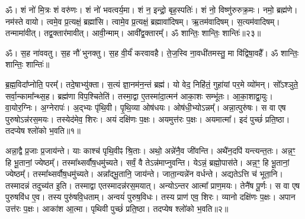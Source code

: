ॐ। शं नो॑ मि॒त्रः शं वरु॑णः। 
शं नो॑ भवत्वर्य॒मा। 
शं न॒ इन्द्रो॒ बृह॒स्पतिः॑। 
शं नो॒ विष्णु॑रुरुक्र॒मः। 
नमो॒ ब्रह्म॑णे। 
नम॑स्ते वायो। 
त्वमे॒व प्र॒त्यक्षं॒ ब्रह्मा॑सि। 
त्वामे॒व प्र॒त्यक्षं॒ ब्रह्मावा॑दिषम्। 
ऋ॒तम॑वादिषम्। 
स॒त्यम॑वादिषम्। 
तन्मामा॑वीत्। 
तद्व॒क्तार॑मावीत्। 
आवी॒न्माम्। 
आवी᳚द्व॒क्तारम्᳚। 
ॐ शान्तिः॒ शान्तिः॒ शान्तिः॑॥२३॥
\anuvakamend[स॒त्यम॑वादिषं॒ पञ्च॑ च]

\clearpage

\setcounter{anuvakam}{0}
ॐ। स॒ह ना॑ववतु। 
स॒ह नौ॑ भुनक्तु। 
स॒ह वी॒र्यं॑ करवावहै। 
ते॒ज॒स्वि ना॒वधी॑तमस्तु॒ मा वि॑द्विषा॒वहै᳚। 
ॐ शान्तिः॒ शान्तिः॒ शान्तिः॑॥%


ब्र॒ह्म॒विदा᳚प्नोति॒ परम्᳚। 
तदे॒षाभ्यु॑क्ता। 
स॒त्यं ज्ञा॒नम॑\-न॒न्तं ब्रह्म॑। 
यो वेद॒ निहि॑तं॒ गुहा॑यां पर॒मे व्यो॑मन्। 
सो᳚ऽश्ञुते॒ सर्वा॒न्कामा᳚न्थ्स॒ह। 
ब्रह्म॑णा वि\-प॒श्चितेति॑। 
तस्मा॒द्वा ए॒तस्मा॑\-दा॒त्मन॑ आका॒शः सम्भू॑तः। 
आ॒का॒शाद्वा॒युः। 
वा॒योर॒ग्निः। 
अ॒ग्नेरापः॑। 
अ॒द्भ्यः पृ॑थि॒वी। 
पृ॒थि॒व्या ओष॑धयः। 
ओष॑धी॒भ्यो\-ऽ\-न्नम्᳚। 
अन्ना॒त्पुरु॑षः। 
स वा एष पुरुषो\-ऽन्न॑\-रस॒मयः। 
तस्येद॑\-मेव॒ शिरः। 
अयं दक्षि॑णः प॒क्षः। 
अयमुत्त॑रः प॒क्षः। 
अयमात्मा᳚। 
इदं पुच्छं॑ प्रति\-॒ष्ठा। 
तदप्येष श्लो॑को भ॒वति॥१॥

अन्ना॒द्वै प्र॒जाः प्र॒जाय॑न्ते। 
याः काश्च॑ पृथि॒वीꣴ श्रि॒ताः। 
अथो॒ अन्ने॑नै॒व जी॑वन्ति। 
अथै॑न॒दपि॑ यन्त्यन्त॒तः। 
अन्न॒ꣳ॒ हि भू॒तानां॒ ज्येष्ठम्᳚। 
तस्मा᳚थ्सर्वौष॒धमु॑च्यते। 
सर्वं॒ वै तेऽन्न॑माप्नुवन्ति। 
येऽन्नं॒ ब्रह्मो॒पास॑ते। 
अन्न॒ꣳ॒ हि भू॒तानां॒ ज्येष्ठम्᳚। 
तस्मा᳚थ्सर्वौष॒धमु॑च्यते। 
अन्ना᳚द्भू॒तानि॒ जाय॑न्ते। 
जाता॒न्यन्ने॑न वर्धन्ते। 
अद्यतेऽत्ति च॑ भूता॒नि। 
तस्मादन्नं तदुच्य॑त इ॒ति। 
तस्माद्वा एतस्मादन्न॑रस॒मयात्। 
अन्योऽन्तर आत्मा᳚ प्राण॒मयः। 
तेनै॑ष पू॒र्णः। 
स वा एष पुरुषवि॑ध ए॒व। 
तस्य पुरु॑षवि॒धताम्। 
अन्वयं॑ पुरुष॒विधः। 
तस्य प्राण॑ एव॒ शिरः। 
व्यानो दक्षि॑णः प॒क्षः। 
अपान उत्त॑रः प॒क्षः। 
आका॑श आ॒त्मा। 
पृथिवी पुच्छं॑ प्रति\-॒ष्ठा। 
तदप्येष श्लो॑को भ॒वति॥२॥

